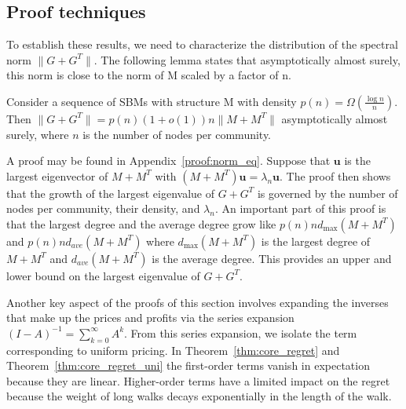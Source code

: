 \subsection{Proof techniques}  To establish these results, we need to characterize the distribution of the spectral norm $\|G+G^T\|$. The following lemma states that asymptotically almost surely, this norm is close to the norm of M scaled by a factor of n. 

\begin{lemma}\label{lem:norm_eq}
    Consider a sequence of SBMs with structure M with density $p(n) = \Omega(\frac{\log n}{n})$. Then $\|G+G^T\| = p(n) \left(1+ o(1)\right) n \| M+M^T\| $ asymptotically almost surely, where $n$ is the number of nodes per community. 
\end{lemma}
A proof may be found in Appendix~\ref{proof:norm_eq}. Suppose that $\mathbf{u}$ is the largest eigenvector of $M+M^T$ with $(M+M^T) \mathbf{u} = \lambda_n \mathbf{u}$. The proof then shows that the growth of the largest eigenvalue of $G+G^T$ is governed by the number of nodes per community, their density, and $\lambda_n$. An important part of this proof is that the largest degree and the average degree grow like $p(n) n d_{\max}(M+M^T)$ and $p(n) n d_{ave}( M+M^T)$ where $d_{\max}(M+M^T)$ is the largest degree of $M+M^T$ and $d_{ave}(M+M^T)$ is the average degree. This provides an upper and lower bound on the largest eigenvalue of $G+G^T$.

Another key aspect of the proofs of this section involves expanding the inverses that make up the prices and profits via the series expansion $(I - A)^{-1} = \sum_{k=0}^\infty A^k$.  From this series expansion,  we isolate the term corresponding to uniform pricing. In Theorem~\ref{thm:core_regret} and Theorem~\ref{thm:core_regret_uni} the first-order terms vanish in expectation because they are linear. Higher-order terms have a limited impact on the regret because the weight of long walks decays exponentially in the length of the walk. 


